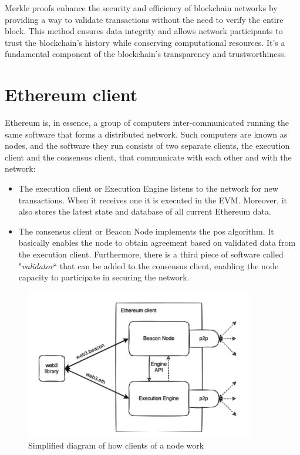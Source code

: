 \documentclass[a4paper,12pt]{article}
\begin{document}
\begin{appendices}
{{Merkle proofs enhance the security and efficiency of blockchain networks by providing a way to validate transactions without the need to verify the entire block. This method ensures data integrity and allows network participants to trust the blockchain's history while conserving computational resources. It's a fundamental component of the blockchain's transparency and trustworthiness.} 
}

\section{Ethereum client}
\label{appendix:ethereum-client}
{
Ethereum is, in essence, a group of computers inter-communicated running the same software that forms a distributed network. Such computers are known as nodes, and the software they run consists of two separate clients, the execution client and the consensus client, that communicate with each other and with the network:

\begin{itemize}
    \item The execution client or Execution Engine listens to the network for new transactions. When it receives one it is executed in the EVM. Moreover, it also stores the latest state and database of all current Ethereum data.
    \item The consensus client or Beacon Node implements the \acrlong{pos} algorithm. It basically enables the node to obtain agreement based on validated data from the execution client. Furthermore, there is a third piece of software called "\textit{validator}`` that can be added to the consensus client, enabling the node capacity to participate in securing the network.
\end{itemize}


\begin{figure}[H]
\centering
\includegraphics[width=10cm]{img/ethereum/eth1eth2client.png}
\caption[Simplified diagram of how clients of a node work]{\footnotesize{Simplified diagram of how clients of a node work}}
\label{fig:node-clients}
\end{figure}

}
\end{appendices}
\end{document}

